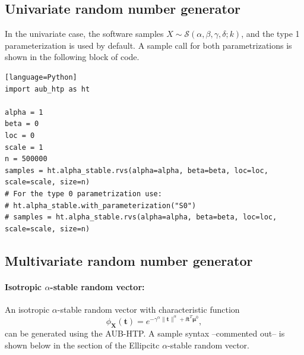 \subsection{Univariate random number generator}
In the univariate case, the software samples $X \sim\mathcal{S}(\alpha,\beta,\gamma,\delta;k)$, and the type 1 parameterization is used by default. A sample call for both parametrizations is shown in the following block of code.
\begin{verbatim}[language=Python]
import aub_htp as ht

alpha = 1
beta = 0
loc = 0
scale = 1
n = 500000
samples = ht.alpha_stable.rvs(alpha=alpha, beta=beta, loc=loc, scale=scale, size=n)
# For the type 0 parametrization use:
# ht.alpha_stable.with_parameterization("S0")
# samples = ht.alpha_stable.rvs(alpha=alpha, beta=beta, loc=loc, scale=scale, size=n)
\end{verbatim}

\subsection{Multivariate random number generator}

\paragraph{Isotropic $\alpha$-stable random vector:} An isotropic $\alpha$-stable random vector with characteristic function
\[
    \phi_{\mathbf{X}}(\mathbf{t})=e^{-\gamma^{\alpha}\|\mathbf{t}\|^{\alpha}
+\ii\mathbf{t}^T\boldsymbol{\mu}^0},
\]
can be generated using the AUB-HTP. A sample syntax --commented out-- is shown below in the section of the Ellipcitc $\alpha$-stable random vector.

